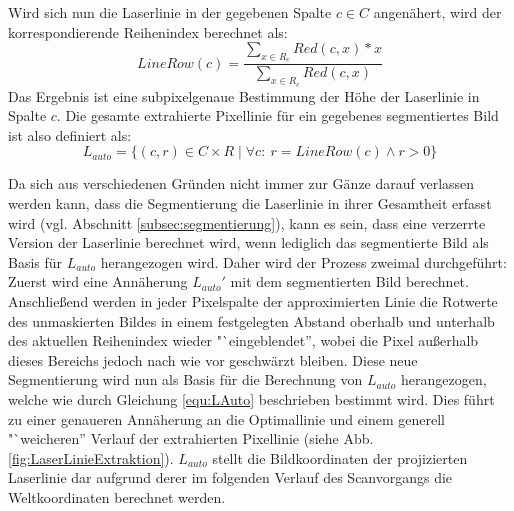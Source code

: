  Wird sich nun die Laserlinie in der gegebenen Spalte \(c \in C\) angenähert, wird der korrespondierende Reihenindex berechnet als:
\begin{equation}
LineRow(c) = \frac{\sum_{x \in R_{c}} Red(c,x) * x}{\sum_{x \in R_{c}} Red(c,x)}
\end{equation}
Das Ergebnis ist eine subpixelgenaue Bestimmung der Höhe der Laserlinie in Spalte \(c\). Die gesamte extrahierte Pixellinie für ein gegebenes segmentiertes Bild ist also definiert als: 
\begin{equation}
\label{equ:LAuto}
L_{auto} = \lbrace (c,r) \in C \times R \mid \forall c\colon \ r = LineRow(c) \wedge r > 0 \rbrace
\end{equation} 

Da sich aus verschiedenen Gründen nicht immer zur Gänze darauf verlassen werden kann, dass die Segmentierung die Laserlinie in ihrer  Gesamtheit erfasst wird (vgl. Abschnitt \ref{subsec:segmentierung}), kann es sein, dass eine verzerrte Version der Laserlinie berechnet wird, wenn lediglich das segmentierte Bild als Basis für \(L_{auto}\) herangezogen wird. Daher wird der Prozess zweimal durchgeführt: Zuerst wird eine Annäherung \(L_{auto}\prime\) mit dem segmentierten Bild berechnet. Anschließend werden in jeder Pixelspalte der approximierten Linie die Rotwerte des unmaskierten Bildes in einem festgelegten Abstand oberhalb und unterhalb des aktuellen Reihenindex wieder "`eingeblendet'', wobei die Pixel außerhalb dieses Bereichs jedoch nach wie vor geschwärzt bleiben. Diese neue Segmentierung wird nun als Basis für die Berechnung von \(L_{auto}\) herangezogen, welche wie durch Gleichung \ref{equ:LAuto} beschrieben bestimmt wird. Dies führt zu einer genaueren Annäherung an die Optimallinie und einem generell "`weicheren'' Verlauf der extrahierten Pixellinie (siehe Abb. \ref{fig:LaserLinieExtraktion}). \(L_{auto}\) stellt die Bildkoordinaten der projizierten Laserlinie dar aufgrund derer im folgenden Verlauf des Scanvorgangs die Weltkoordinaten berechnet werden.

